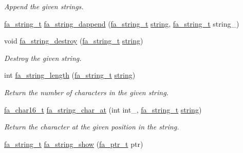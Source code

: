 \begin{DoxyCompactItemize}
\begin{DoxyCompactList}\small\item\em Append the given strings. \end{DoxyCompactList}\item 
\hyperlink{group___fa_string_gacada63033b77bc6c39fa632ae199349b}{fa\-\_\-string\-\_\-t} \hyperlink{group___fa_string_ga5d2b8bc86ca8e619b5acd8ee3ce646d1}{fa\-\_\-string\-\_\-dappend} (\hyperlink{group___fa_string_gacada63033b77bc6c39fa632ae199349b}{fa\-\_\-string\-\_\-t} \hyperlink{util_8h_a41106000aac73b61e4fc2ef9dd39a603}{string}, \hyperlink{group___fa_string_gacada63033b77bc6c39fa632ae199349b}{fa\-\_\-string\-\_\-t} string\-\_\-)
\item 
void \hyperlink{group___fa_string_ga564b75f4d9f1746aae14be49ae5ff14d}{fa\-\_\-string\-\_\-destroy} (\hyperlink{group___fa_string_gacada63033b77bc6c39fa632ae199349b}{fa\-\_\-string\-\_\-t} \hyperlink{util_8h_a41106000aac73b61e4fc2ef9dd39a603}{string})
\begin{DoxyCompactList}\small\item\em Destroy the given string. \end{DoxyCompactList}\item 
int \hyperlink{group___fa_string_ga976152a3555291c01ee4789fd430a735}{fa\-\_\-string\-\_\-length} (\hyperlink{group___fa_string_gacada63033b77bc6c39fa632ae199349b}{fa\-\_\-string\-\_\-t} \hyperlink{util_8h_a41106000aac73b61e4fc2ef9dd39a603}{string})
\begin{DoxyCompactList}\small\item\em Return the number of characters in the given string. \end{DoxyCompactList}\item 
\hyperlink{group___fa_ga33e83372a0abc1895fdad5fb4d15eae3}{fa\-\_\-char16\-\_\-t} \hyperlink{group___fa_string_ga65a30c7ba8710cb6c7547469a5854fe5}{fa\-\_\-string\-\_\-char\-\_\-at} (int int\-\_\-, \hyperlink{group___fa_string_gacada63033b77bc6c39fa632ae199349b}{fa\-\_\-string\-\_\-t} \hyperlink{util_8h_a41106000aac73b61e4fc2ef9dd39a603}{string})
\begin{DoxyCompactList}\small\item\em Return the character at the given position in the string. \end{DoxyCompactList}\item 
\hyperlink{group___fa_string_gacada63033b77bc6c39fa632ae199349b}{fa\-\_\-string\-\_\-t} \hyperlink{group___fa_string_ga0aefa62c17e377bdf1502d6a31c989a7}{fa\-\_\-string\-\_\-show} (\hyperlink{group___fa_ga915ddeae99ad7568b273d2b876425197}{fa\-\_\-ptr\-\_\-t} ptr)

\end{DoxyCompactItemize}
